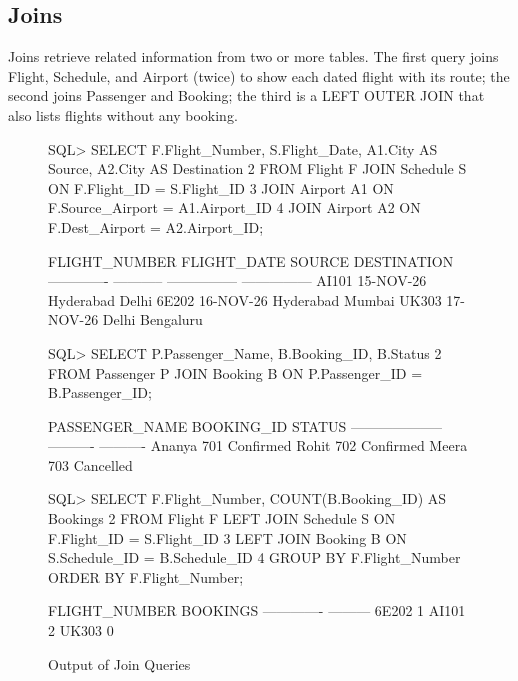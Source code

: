 \documentclass[12pt,a4paper]{article}
\begin{document}
\subsection{Joins}
Joins retrieve related information from two or more tables. The first query joins Flight, Schedule, and
Airport (twice) to show each dated flight with its route; the second joins Passenger and Booking; the third
is a LEFT OUTER JOIN that also lists flights without any booking.
\begin{figure}[H]
\begin{terminal}
SQL> SELECT F.Flight_Number, S.Flight_Date, A1.City AS Source, A2.City AS Destination
  2  FROM Flight F JOIN Schedule S ON F.Flight_ID = S.Flight_ID
  3  JOIN Airport A1 ON F.Source_Airport = A1.Airport_ID
  4  JOIN Airport A2 ON F.Dest_Airport   = A2.Airport_ID;

FLIGHT_NUMBER FLIGHT_DATE SOURCE          DESTINATION
------------- ----------- --------------- ---------------
AI101         15-NOV-26   Hyderabad       Delhi
6E202         16-NOV-26   Hyderabad       Mumbai
UK303         17-NOV-26   Delhi           Bengaluru

SQL> SELECT P.Passenger_Name, B.Booking_ID, B.Status
  2  FROM Passenger P JOIN Booking B ON P.Passenger_ID = B.Passenger_ID;

PASSENGER_NAME       BOOKING_ID STATUS
-------------------- ---------- ----------
Ananya                      701 Confirmed
Rohit                       702 Confirmed
Meera                       703 Cancelled

SQL> SELECT F.Flight_Number, COUNT(B.Booking_ID) AS Bookings
  2  FROM Flight F LEFT JOIN Schedule S ON F.Flight_ID = S.Flight_ID
  3  LEFT JOIN Booking B ON S.Schedule_ID = B.Schedule_ID
  4  GROUP BY F.Flight_Number ORDER BY F.Flight_Number;

FLIGHT_NUMBER  BOOKINGS
------------- ---------
6E202                 1
AI101                 2
UK303                 0
\end{terminal}
\caption{Output of Join Queries}
\end{figure}
\end{document}
